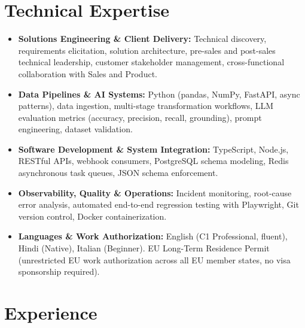 \documentclass[10pt,a4paper]{article}
\begin{document}
\section{Technical Expertise}
\begin{itemize}
  \item \textbf{Solutions Engineering \& Client Delivery:} Technical discovery, requirements elicitation, solution architecture, pre-sales and post-sales technical leadership, customer stakeholder management, cross-functional collaboration with Sales and Product.
  \item \textbf{Data Pipelines \& AI Systems:} Python (pandas, NumPy, FastAPI, async patterns), data ingestion, multi-stage transformation workflows, LLM evaluation metrics (accuracy, precision, recall, grounding), prompt engineering, dataset validation.
  \item \textbf{Software Development \& System Integration:} TypeScript, Node.js, RESTful APIs, webhook consumers, PostgreSQL schema modeling, Redis asynchronous task queues, JSON schema enforcement.
  \item \textbf{Observability, Quality \& Operations:} Incident monitoring, root-cause error analysis, automated end-to-end regression testing with Playwright, Git version control, Docker containerization.
  \item \textbf{Languages \& Work Authorization:} English (C1 Professional, fluent), Hindi (Native), Italian (Beginner). EU Long-Term Residence Permit (unrestricted EU work authorization across all EU member states, no visa sponsorship required).
\end{itemize}

\section{Experience}
\end{document}
